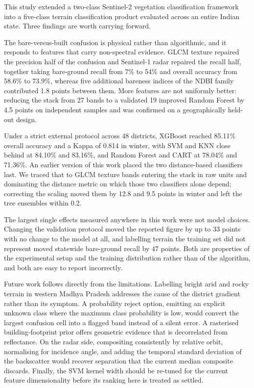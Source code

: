 \documentclass[conference]{IEEEtran}
\begin{document}
This study extended a two-class Sentinel-2 vegetation classification
framework into a five-class terrain classification product evaluated
across an entire Indian state. Three findings are worth carrying
forward.

The bare-versus-built confusion is physical rather than algorithmic, and
it responds to features that carry non-spectral evidence. GLCM texture
repaired the precision half of the confusion and Sentinel-1 radar
repaired the recall half, together taking bare-ground recall from 7\% to
54\% and overall accuracy from 58.6\% to 73.9\%, whereas five additional
bareness indices of the NDBI family contributed 1.8 points between them.
More features are not uniformly better: reducing the stack from 27 bands
to a validated 19 improved Random Forest by 4.5 points on independent
samples and was confirmed on a geographically held-out design.

Under a strict external protocol across 48 districts, XGBoost reached
85.11\% overall accuracy and a Kappa of 0.814 in winter, with SVM and
KNN close behind at 84.10\% and 83.16\%, and Random Forest and CART at
78.04\% and 71.36\%. An earlier version of this work placed the two
distance-based classifiers last. We traced that to GLCM texture bands
entering the stack in raw units and dominating the distance metric on
which those two classifiers alone depend; correcting the scaling moved
them by 12.8 and 9.5 points in winter and left the tree ensembles
within 0.2.

The largest single effects measured anywhere in this work were not model
choices. Changing the validation protocol moved the reported figure by
up to 33 points with no change to the model at all, and labelling
terrain the training set did not represent moved statewide bare-ground
recall by 47 points. Both are properties of the experimental setup and
the training distribution rather than of the algorithm, and both are
easy to report incorrectly.

Future work follows directly from the limitations. Labelling bright arid
and rocky terrain in western Madhya Pradesh addresses the cause of the
district gradient rather than its symptom. A probability reject option,
emitting an explicit unknown class where the maximum class probability
is low, would convert the largest confusion cell into a flagged band
instead of a silent error. A rasterised building-footprint prior offers
geometric evidence that is decorrelated from reflectance. On the radar
side, compositing consistently by relative orbit, normalising for
incidence angle, and adding the temporal standard deviation of the
backscatter would recover separation that the current median composite
discards. Finally, the SVM kernel width should be re-tuned for the
current feature dimensionality before its ranking here is treated as
settled.
\end{document}
